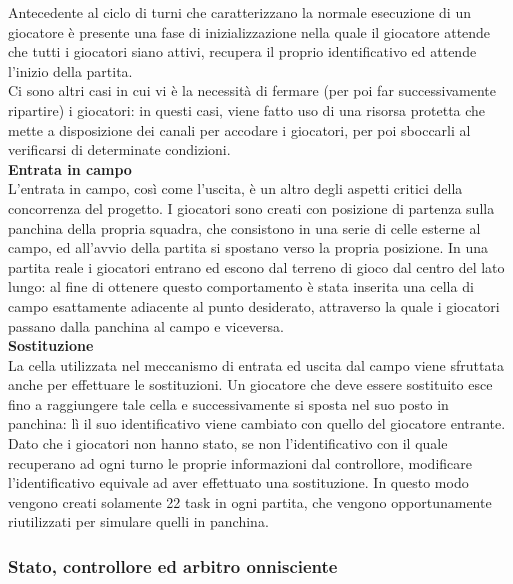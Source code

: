 Antecedente al ciclo di turni che caratterizzano la normale esecuzione di un giocatore è presente una fase di inizializzazione nella quale il giocatore attende che tutti i giocatori siano attivi, recupera il proprio identificativo ed attende l'inizio della partita.\\

Ci sono altri casi in cui vi è la necessità di fermare (per poi far successivamente ripartire) i giocatori: in questi casi, viene fatto uso di una risorsa protetta che mette a disposizione dei canali per accodare i giocatori, per poi sboccarli al verificarsi di determinate condizioni.\\

\textbf{Entrata in campo}\\

L'entrata in campo, così come l'uscita, è un altro degli aspetti critici della concorrenza del progetto. I giocatori sono creati con posizione di partenza sulla panchina della propria squadra, che consistono in una serie di celle esterne al campo, ed all'avvio della partita si spostano verso la propria posizione. In una partita reale i giocatori entrano ed escono dal terreno di gioco dal centro del lato lungo: al fine di ottenere questo comportamento è stata inserita una cella di campo esattamente adiacente al punto desiderato, attraverso la quale i giocatori passano dalla panchina al campo e viceversa.\\

\textbf{Sostituzione}\\

La cella utilizzata nel meccanismo di entrata ed uscita dal campo viene sfruttata anche per effettuare le sostituzioni. Un giocatore che deve essere sostituito esce fino a raggiungere tale cella e successivamente si sposta nel suo posto in panchina: lì il suo identificativo viene cambiato con quello del giocatore entrante. Dato che i giocatori non hanno stato, se non l'identificativo con il quale recuperano ad ogni turno le proprie informazioni dal controllore, modificare l'identificativo equivale ad aver effettuato una sostituzione. In questo modo vengono creati solamente 22 task in ogni partita, che vengono opportunamente riutilizzati per simulare quelli in panchina.\\

\subsubsection{Stato, controllore ed arbitro onnisciente}
\label{sec:analisi_concorrenza_controllore_arbitro}

